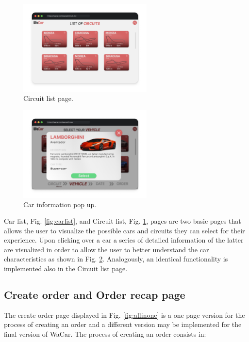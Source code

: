 \begin{figure}[h]
    \centering
    \includegraphics[width=0.6\textwidth]{mockup/CircuitList.png}
    \caption{Circuit list page.}
    \label{fig:circuitlist}
\end{figure}

\begin{figure}[!h]
    \centering
    \includegraphics[width=0.6\textwidth]{mockup/InfoCar.png}
    \caption{Car information pop up.}
    \label{fig:infocar}
\end{figure}

Car list, Fig. \ref{fig:carlist}, and Circuit list, Fig. \ref{fig:circuitlist}, pages are two basic pages that allows the user to visualize the possible cars and circuits they can select for their experience. Upon clicking over a car a series of detailed information of the latter are visualized in order to allow the user to better understand the car characteristics as shown in Fig. \ref{fig:infocar}. Analogously, an identical functionality is implemented also in the Circuit list page.

\subsection{Create order and Order recap page}

The create order page displayed in Fig. \ref{fig:allinone} is a one page version for the process of creating an order and a different version may be implemented for the final version of WaCar. The process of creating an order consists in:

